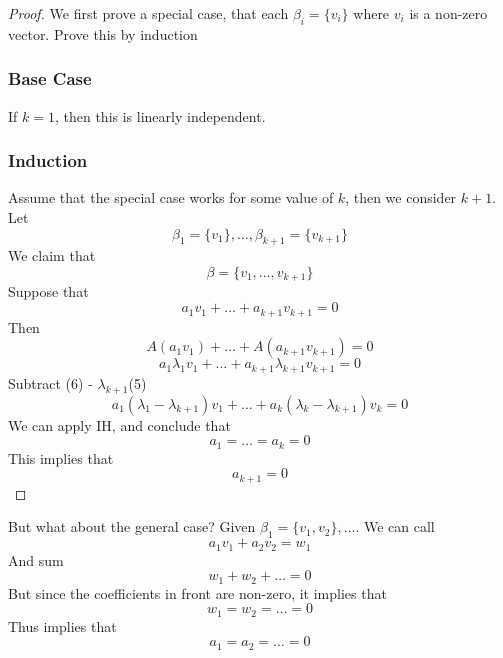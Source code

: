 \documentclass{article}
\newtheorem{one minute paper}[theorem]{One Minute Paper}
\begin{document}
\begin{proof}
    We first prove a special case, that each $\beta_i = \{v_i\}$ where $v_i$ is a non-zero vector. Prove this by induction
    \subsubsection*{Base Case}
    If $k=1$, then this is linearly independent. 
    \subsubsection*{Induction}
    Assume that the special case works for some value of $k$, then we consider $k+1$. Let 
    \begin{equation}
        \beta_1 = \{v_1\}, \dots, \beta_{k+1}=\{v_{k+1}\}
    \end{equation}
    We claim that 
    \begin{equation}
        \beta = \{v_1, \dots, v_{k+1}\}
    \end{equation}
    Suppose that 
    \begin{equation}
        a_1v_1 + \dots + a_{k+1}v_{k+1} = 0
    \end{equation}
    Then 
    \begin{equation}
        A(a_1v_1) + \dots + A(a_{k+1}v_{k+1}) = 0
    \end{equation}
    \begin{equation}
        a_1\lambda_1v_1  + \dots + a_{k+1}\lambda_{k+1}v_{k+1} = 0
    \end{equation}
    Subtract (6) - $\lambda_{k+1}$(5)
    \begin{equation}
        a_1(\lambda_1 - \lambda_{k+1})v_1 + \dots + a_k(\lambda_k - \lambda_{k+1})v_k = 0
    \end{equation}
    We can apply IH, and conclude that 
    \begin{equation}
        a_1 = \dots = a_k = 0
    \end{equation}
    This implies that 
    \begin{equation}
        a_{k+1} = 0
    \end{equation}
\end{proof}
But what about the general case? Given $\beta_1 = \{v_1,v_2\}, \dots$. We can call 
\begin{equation}
    a_1v_1 + a_2v_2 = w_1
\end{equation}
And sum 
\begin{equation}
    w_1 + w_2 + \dots = 0
\end{equation}
But since the coefficients in front are non-zero, it implies that 
\begin{equation}
    w_1 = w_2 = \dots = 0
\end{equation}
Thus implies that 
\begin{equation}
    a_1 = a_2 = \dots = 0
\end{equation}
\end{document}

